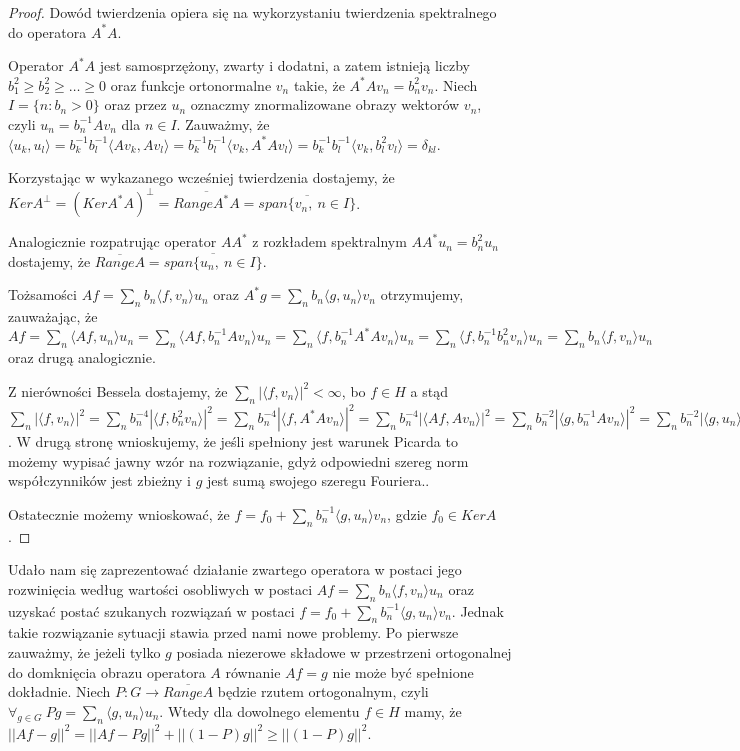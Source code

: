 \documentclass[12pt]{article}
\begin{document}
\begin{proof}
Dowód twierdzenia opiera się na wykorzystaniu twierdzenia spektralnego do operatora $A^*A$.

Operator $A^*A$ jest samosprzężony, zwarty i dodatni, a zatem istnieją liczby $b_1^2\geq b_2^2\geq\dots\geq 0$ oraz funkcje ortonormalne $v_n$ takie, że $A^*Av_n=b_n^2v_n$. Niech $I=\{n\colon b_n>0\}$ oraz przez $u_n$ oznaczmy znormalizowane obrazy wektorów $v_n$, czyli $u_n=b_n^{-1}Av_n$ dla $n\in I$. Zauważmy, że $\langle u_k,u_l\rangle=b_k^{-1}b_l^{-1}\langle Av_k, Av_l\rangle=b_k^{-1}b_l^{-1}\langle v_k,A^*Av_l\rangle=b_k^{-1}b_l^{-1}\langle v_k,b_l^2v_l\rangle=\delta_{kl}$.

Korzystając w wykazanego wcześniej twierdzenia dostajemy, że $KerA^{\perp}=(KerA^*A)^{\perp}=\overline{RangeA^*A}=\overline{span\{v_n,\ n\in I\}}$.

Analogicznie rozpatrując operator $AA^*$ z rozkładem spektralnym $AA^*u_n=b_n^2u_n$ dostajemy, że $\overline{RangeA}=\overline{span\{u_n,\ n\in I\}}$.

Tożsamości $Af=\sum_nb_n\langle f, v_n\rangle u_n$ oraz $A^*g=\sum_nb_n\langle g, u_n\rangle v_n$ otrzymujemy, zauważając, że
$Af=\sum_n\langle Af,u_n\rangle u_n=\sum_n\langle Af, b_n^{-1}Av_n\rangle u_n=\sum_n\langle f,b_n^{-1}A^*Av_n\rangle u_n=\sum_n\langle f,b_n^{-1}b_n^2v_n\rangle u_n=\sum_n b_n\langle f,v_n\rangle u_n$ oraz drugą analogicznie.

Z nierówności Bessela dostajemy, że $\sum_n|\langle f, v_n\rangle |^2<\infty$, bo $f\in H$ a stąd
$\sum_n|\langle f,v_n\rangle|^2=\sum_nb_n^{-4}|\langle f,b_n^2v_n\rangle|^2=\sum_nb_n^{-4}|\langle f, A^*Av_n\rangle|^2=\sum_nb_n^{-4}|\langle Af,Av_n\rangle|^2=\sum_nb_n^{-2}|\langle g, b_n^{-1}Av_n\rangle|^2=\sum_nb_n^{-2}|\langle g, u_n\rangle|^2<\infty$. W drugą stronę wnioskujemy, że jeśli spełniony jest warunek Picarda to możemy wypisać jawny wzór na rozwiązanie,  gdyż odpowiedni szereg norm współczynników jest zbieżny i $g$ jest sumą swojego szeregu Fouriera..

Ostatecznie możemy wnioskować, że $f=f_0+\sum_nb_n^{-1}\langle g, u_n\rangle v_n$, gdzie $f_0\in KerA$.
\end{proof}

Udało nam się zaprezentować działanie zwartego operatora w postaci jego rozwinięcia według wartości osobliwych w postaci $Af=\sum_nb_n\langle f, v_n\rangle u_n$ oraz uzyskać postać szukanych rozwiązań w postaci $f=f_0+\sum_nb_n^{-1}\langle g, u_n\rangle v_n$. Jednak takie rozwiązanie sytuacji stawia przed nami nowe problemy. Po pierwsze zauważmy, że jeżeli tylko $g$ posiada niezerowe składowe w przestrzeni ortogonalnej do domknięcia obrazu operatora $A$ równanie $Af=g$ nie może być spełnione dokładnie. Niech $P\colon G\to \overline{RangeA}$ będzie rzutem ortogonalnym, czyli $\forall_{g\in G}\ Pg=\sum_n\langle g,u_n\rangle u_n$. Wtedy dla dowolnego elementu $f\in H$ mamy, że $||Af-g||^2=||Af-Pg||^2+||(1-P)g||^2\geq ||(1-P)g||^2$.
\end{document}
